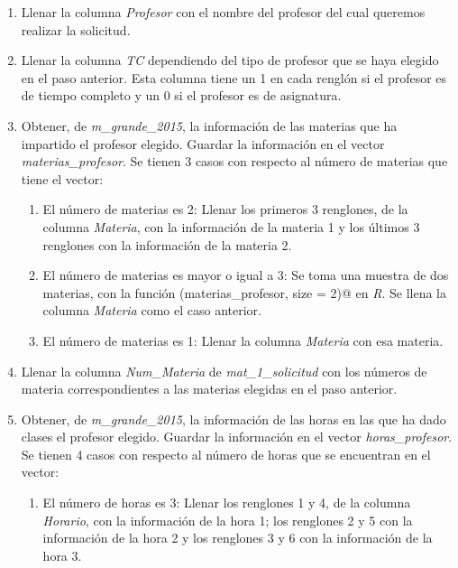   \begin{enumerate}

\item Llenar la columna \textit{Profesor} con el nombre del profesor del cual queremos realizar la solicitud.

\item Llenar la columna \textit{TC} dependiendo del tipo de profesor que se haya elegido en el paso anterior. Esta columna tiene un 1 en cada renglón si el profesor es de tiempo completo y un 0 si el profesor es de asignatura.

\item Obtener, de \textit{m\_grande\_2015}, la información de las materias que ha impartido el profesor elegido. Guardar la información en el vector \textit{materias\_profesor}. Se tienen 3 casos con respecto al número de materias que tiene el vector:

\begin{enumerate}
\item El número de materias es 2: Llenar los primeros 3 renglones, de la columna \textit{Materia}, con la información de la materia 1 y los últimos 3 renglones con la información de la materia 2.

\item El número de materias es mayor o igual a 3: Se toma una muestra de dos materias, con la función \verb@sample(materias_profesor, size = 2)@ en \textit{R}. Se llena la columna \textit{Materia} como el caso anterior.

\item El número de materias es 1: Llenar la columna \textit{Materia} con esa materia.
\end{enumerate}

\item Llenar la columna \textit{Num\_Materia} de \textit{mat\_1\_solicitud} con los números de materia correspondientes a las materias elegidas en el paso anterior.

\item Obtener, de \textit{m\_grande\_2015}, la información de las horas en las que ha dado clases el profesor elegido. Guardar la información en el vector \textit{horas\_profesor}. Se tienen 4 casos con respecto al número de horas que se encuentran en el vector:

\begin{enumerate}
\item El número de horas es 3: Llenar los renglones 1 y 4, de la columna \textit{Horario}, con la información de la hora 1; los renglones 2 y 5 con la información de la hora 2 y los renglones 3 y 6 con la información de la hora 3.


\end{enumerate}
\end{enumerate}
